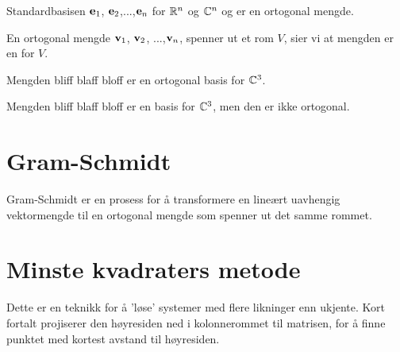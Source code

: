 \begin{ex}
Standardbasisen $\mathbf{e}_1$, $\mathbf{e}_2$,...,$\mathbf{e}_n$ for $\mathbb{R}^n$ og $\mathbb{C}^n$ og  er en ortogonal mengde.
\end{ex}

\begin{defnx}
En ortogonal mengde $\mathbf{v}_1$, $\mathbf{v}_2$, ...,$\mathbf{v}_n$, spenner ut et rom $V$, sier vi at mengden er en  for $V$.
\end{defnx}

\begin{ex}
Mengden bliff blaff bloff er en ortogonal basis for $\mathbb{C}^3$.
\end{ex}

\begin{ex}
Mengden bliff blaff bloff er en basis for $\mathbb{C}^3$, men den er ikke ortogonal.
\end{ex}



\section*{Gram-Schmidt}
Gram-Schmidt er en prosess for å transformere en lineært uavhengig vektormengde til en ortogonal mengde som spenner ut det samme rommet. 

\section*{Minste kvadraters metode}
Dette er en teknikk for å 'løse' systemer med flere likninger enn ukjente. Kort fortalt projiserer den høyresiden ned i kolonnerommet til matrisen, for å finne punktet med kortest avstand til høyresiden.

\kapittelslutt
